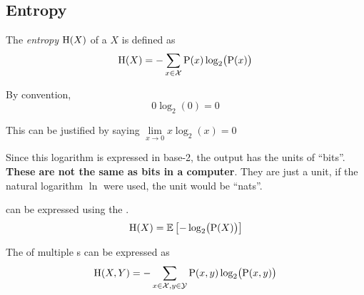 \subsection{Entropy}\label{subsec:Entropy}
\begin{definition}[Entropy]\label{def:Entropy}
  The \emph{entropy} $\operatorname{\operatorname{H}}(X)$ of a  $X$ is defined as
  \begin{equation}\label{eq:Entropy}
    \operatorname{\operatorname{H}}(X) = - \sum\limits_{x \in \mathcal{X}} \operatorname{\operatorname{P}}(x) \log_{2}\bigl( \operatorname{\operatorname{P}}(x) \bigr)
  \end{equation}

  \begin{remark}[Probability is 0]\label{rmk:Entropy_Probability_0}
    By convention,
    \begin{equation}\label{eq:Entropy_Probability_0}
      0 \log_{2} (0) = 0
    \end{equation}

    This can be justified by saying $\lim\limits_{x \to 0} x \log_{2}(x) = 0$
  \end{remark}

  \begin{remark}\label{rmk:Entropy_Bits}
    Since this logarithm is expressed in base-2, the output has the units of ``bits''.
    \textbf{These are not the same as bits in a computer}.
    They are just a unit, if the natural logarithm $\ln$ were used, the unit would be ``nats''.
  \end{remark}

   can be expressed using the .
  \begin{equation}\label{eq:Entropy-Expected_Value}
    \operatorname{\operatorname{H}}(X) = \operatorname{\operatorname{\mathbb{E}}} \left[ - \log_{2}\bigl( \operatorname{\operatorname{P}}(X) \bigr) \right]
  \end{equation}

  The  of multiple s can be expressed as
  \begin{equation}\label{eq:Entropy-Multiple_Discrete_Random_Variables}
    \operatorname{\operatorname{H}}(X,Y) = - \sum\limits_{x \in \mathcal{X}, y \in \mathcal{Y}} \operatorname{\operatorname{P}}(x, y) \log_{2} \bigl( \operatorname{\operatorname{P}}(x, y) \bigr)
  \end{equation}
\end{definition}

